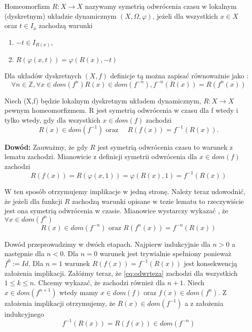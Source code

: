 \begin{definition}
  Homeomorfizm $ R: X \to X $ nazywamy symetrią odwrócenia czasu w lokalnym (dyskretnym) układzie dynamicznym $ (X,\Omega,\varphi)$,
  jeżeli dla wszystkich $ x \in X $ oraz $ t \in I_x $ zachodzą warunki 
  \begin{enumerate}
   \item $ -t \in I_{R(x)}$,
   \item $ R(\varphi(x,t)) = \varphi(R(x), -t)$
  \end{enumerate}

\end{definition}

Dla układów dyskretnych $(X,f) $ definicje tą można zapisać równoważnie jako :
  $$
   \forall n \in \mathbb Z, \forall x \in dom(f^n) R(x) \in dom(f^{-n}), f^{-n}(R(x)) = R(f^n(x))
  $$

\begin{lemma}
  \label{lem:reversedTime}
   Niech (X,f) będzie lokalnym dyskretnym układem dynamicznym, $ R : X\to X $ pewnym homeomorfizmem. R jest 
   symetrią odwrócenia w czasu dla f wtedy i tylko wtedy, gdy dla wszystkich $ x \in dom(f) $ zachodzi
   \begin{equation}
       R(x) \in dom(f^{-1}) \mbox{ oraz } \quad R(f(x)) = f^{-1}(R(x)).
   \end{equation}

\end{lemma}

\textbf{Dowód:}
  Zauważmy, że gdy $R$ jest symetrią odwrócenia czasu to warunek z lematu zachodzi. Mianowicie z definicji
  symetrii odwrócenia dla $ x \in dom(f) $ zachodzi 
    \begin{equation}
	R(f(x)) = R(\varphi(x,1)) = \varphi(R(x),1) = f^{-1}(R(x))
    \end{equation}

    W ten sposób otrzymujemy implikacje w jedną stronę. Należy teraz udowodnić, że jeżeli dla funkcji $ R $ 
    zachodzą warunki opisane w tezie lematu to rzeczywiście jest ona symetrią odwrócenia w czasie.
    Mianowice wystarczy wykazać , że $ \forall x \in dom(f^n) $
    \begin{equation}
      \label{eq:odwrteza}
       R(x) \in dom(f^{-n}) \mbox{ oraz } R(f^n(x)) = f^{-n}(R(x))
    \end{equation}

    Dowód przeprowadzimy w dwóch etapach. Najpierw indukcyjnie dla $ n > 0 $ a następnie dla $ n < 0 $.
    Dla $ n = 0 $ warunek jest trywialnie spełniony ponieważ $ f^0 := Id $.
    Dla $ n = 1 $ warunek $ R(f(x)) = f^{-1}(R(x)) $ jest konsekwencją założenia implikacji.
    Załóżmy teraz, że \eqref{eq:odwrteza} zachodzi dla wszystkich $ 1 \leq k \leq n $. Chcemy wykazać, że 
    zachodzi również dla $ n+1$.
    Niech $ x \in dom(f^{n+1}) $ wtedy mamy $ x \in dom(f) $ oraz $ f(x) \in dom(f^n) $. Z założenia 
    implikacji otrzymujemy, że $ R(x) \in dom(f^{-1})$ a z założenia indukcyjnego 
      $$
	f^{-1}(R(x)) = R(f(x)) \in dom(f^{-n})
      $$
      
